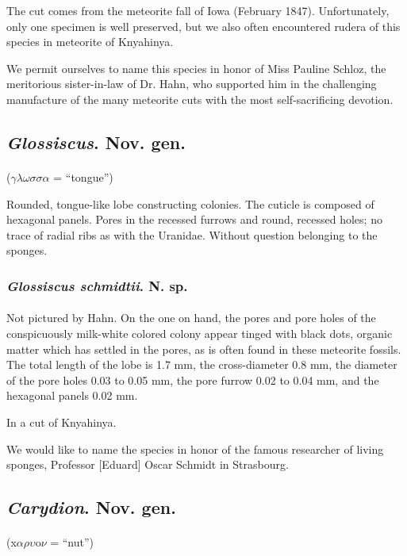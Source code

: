 \documentclass[a4paper, 12pt, oneside]{article}
\begin{document}
The cut comes from the meteorite fall of Iowa (February 1847). Unfortunately, only one specimen is well preserved, but we also often encountered rudera of this species in meteorite of Knyahinya.

We permit ourselves to name this species in honor of Miss Pauline Schloz, the meritorious sister-in-law of Dr. Hahn, who supported him in the challenging manufacture of the many meteorite cuts with the most self-sacrificing devotion.
\subsection{\emph{Glossiscus}. Nov. gen.}
\paragraph{}
($\gamma\lambda\omega\sigma\sigma\alpha$ = ``tongue'')%

Rounded, tongue-like lobe constructing colonies. The cuticle is composed of hexagonal panels. Pores in the recessed furrows and round, recessed holes; no trace of radial ribs as with the Uranidae. Without question belonging to the sponges.
\subsubsection{\emph{Glossiscus schmidtii}. N. sp.}
\paragraph{}
Not pictured by Hahn. On the one on hand, the pores and pore holes of the conspicuously milk-white colored colony appear tinged with black dots, organic matter which has settled in the pores, as is often found in these meteorite fossils. The total length of the lobe is 1.7 mm, the cross-diameter 0.8 mm, the diameter of the pore holes 0.03 to 0.05 mm, the pore furrow 0.02 to 0.04 mm, and the hexagonal panels 0.02 mm.

In a cut of Knyahinya.

We would like to name the species in honor of the famous researcher of living sponges, Professor [Eduard] Oscar Schmidt in Strasbourg.
\subsection{\emph{Carydion}. Nov. gen.}
\paragraph{}
(x$\alpha\rho\upsilon$o$\nu$ = ``nut'')%
\end{document}
